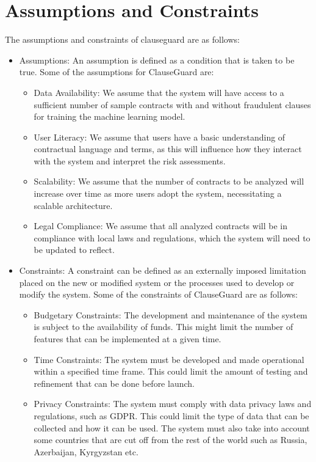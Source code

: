 \section{ Assumptions and Constraints \label{Section::Assumptions and Constraints}}
The assumptions and constraints of clauseguard are as follows:
\begin{itemize}
    \item Assumptions: An assumption is defined as a condition that is taken to be true. Some of the assumptions for ClauseGuard are: 
    \begin{itemize}
        \item Data Availability: We assume that the system will have access to a sufficient number of sample contracts with and without fraudulent clauses for training the machine learning model.
        \item User Literacy: We assume that users have a basic understanding of contractual language and terms, as this will influence how they interact with the system and interpret the risk assessments.
        \item Scalability: We assume that the number of contracts to be analyzed will increase over time as more users adopt the system, necessitating a scalable architecture.
        \item Legal Compliance: We assume that all analyzed contracts will be in compliance with local laws and regulations, which the system will need to be updated to reflect.






    \end{itemize}
    \item Constraints: A constraint can be defined as an externally imposed limitation placed on the new or modified system or the processes used to develop
or modify the system. Some of the constraints of ClauseGuard are as follows: 
\begin{itemize}
    \item Budgetary Constraints: The development and maintenance of the system is subject to the availability of funds. This might limit the number of features that can be implemented at a given time.
    \item Time Constraints: The system must be developed and made operational within a specified time frame. This could limit the amount of testing and refinement that can be done before launch.
    \item Privacy Constraints: The system must comply with data privacy laws and regulations, such as GDPR. This could limit the type of data that can be collected and how it can be used. The system must also take into account some countries that are cut off from the rest of the world such as Russia, Azerbaijan, Kyrgyzstan etc. 


\end{itemize}
\end{itemize}

